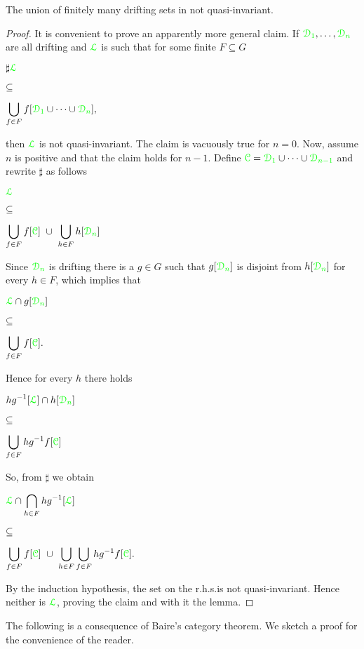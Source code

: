 \documentclass[creche.tex]{subfiles}
\begin{document}
\begin{lemma}\label{lem_newelski}
The union of finitely many drifting sets in not quasi-invariant.
\end{lemma}


\begin{proof}
\def\medrel#1{\parbox[t]{6ex}{$\displaystyle\hfil #1$}}
\def\ceq#1#2#3{\noindent\parbox[t]{30ex}{$\displaystyle #1$}\medrel{#2}{$\displaystyle #3$}}

It is convenient to prove an apparently more general claim. If ${\color{green}\EuScript D_1},\dots,{\color{green}\EuScript D_n}$ are all drifting and ${\color{green}\EuScript L}$ is such that for some finite $F\subseteq G$\medskip 

\ceq{\sharp\hfill{\gr\Ll}}{\subseteq}{\bigcup_{f\in F}f[{\gr\D_1}\cup\dots\cup{\gr\D_n}],} 

then ${\color{green}\EuScript L}$ is not quasi-invariant. The claim is vacuously true for $n=0$. Now, assume $n$ is positive and that the claim holds for $n-1$. Define ${\color{green}\EuScript C}={\color{green}\EuScript D_1}\cup\dots\cup{\color{green}\EuScript D_{n-1}}$ and rewrite $\sharp$ as follows

\ceq{\hfill{\gr\Ll}}{\subseteq}{\bigcup_{f\in F}f[\grC]\ \cup\ \bigcup_{h\in F}h[{\gr\D_n}]}

Since ${\color{green}\EuScript D_n}$ is drifting there is a $g\in G$ such that $g[{\color{green}\EuScript D_n}]$ is disjoint from $h[{\color{green}\EuScript D_n}]$ for every $h\in F$, which implies that\medskip 

\ceq{\hfill{\gr\Ll}\cap g[{\gr\D_n}]}{\subseteq}{\bigcup_{f\in F}f[\grC].} 

Hence for every $h$ there holds\medskip 

\ceq{\hfill h g^{-1}[{\gr\Ll}]\cap h[{\gr\D_n}]}{\subseteq}{\bigcup_{f\in F}hg^{-1}f[\grC]} 

So, from $\sharp$ we obtain\medskip 

\ceq{\hfill{\gr\Ll}\cap\bigcap_{h\in F}h g^{-1}[{\gr\Ll}]}{\subseteq}{\bigcup_{f\in F}f[\grC]\ \cup\ \bigcup_{h\in F}\bigcup_{f\in F}hg^{-1}f[\grC].}\smallskip


\noindent By the induction hypothesis, the set on the r.h.s.\@ is not quasi-invariant. Hence neither is ${\color{green}\EuScript L}$, proving the claim and with it the lemma.
\end{proof}

The following is a consequence of Baire's category theorem. We sketch a proof for the convenience of the reader.
\end{document}
